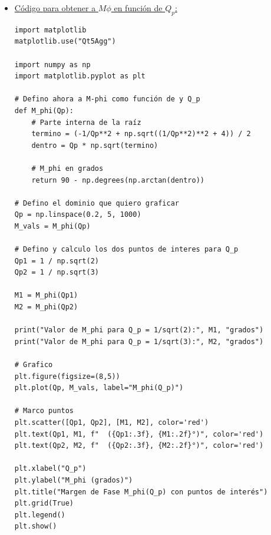 \documentclass[12pt,a4paper]{article}
\begin{document}
\begin{itemize}
\begin{verbatim}
Omega1 = Omega_G(Qp1)
Omega2 = Omega_G(Qp2)
        
print("Valor de Omega_G para Q_p = 1/sqrt(2):", Omega1)
print("Valor de Omega_G para Q_p = 1/sqrt(3):", Omega2)
        
# Grafico
plt.figure(figsize=(8,5))
plt.plot(Qp, Omega_vals, label="Omega_G(Q_p)")
        
# Marco puntos
plt.scatter([Qp1, Qp2], [Omega1, Omega2], color='red')
plt.text(Qp1, Omega1, f"  ({Qp1:.3f}, {Omega1:.3f})", color='red')
plt.text(Qp2, Omega2, f"  ({Qp2:.3f}, {Omega2:.3f})", color='red')
        
plt.xlabel("Q_p")
plt.ylabel("Omega_G")
plt.title("Omega_G(Q_p) con puntos de interés")
plt.grid(True)
plt.legend()
plt.show()
\end{verbatim}
    

    \item \underline{Código para obtener a $M\phi$ en función de $Q_p$:}
\begin{verbatim}
import matplotlib
matplotlib.use("Qt5Agg")

import numpy as np
import matplotlib.pyplot as plt

# Defino ahora a M-phi como función de y Q_p
def M_phi(Qp):
    # Parte interna de la raíz
    termino = (-1/Qp**2 + np.sqrt((1/Qp**2)**2 + 4)) / 2
    dentro = Qp * np.sqrt(termino)

    # M_phi en grados
    return 90 - np.degrees(np.arctan(dentro))

# Defino el dominio que quiero graficar
Qp = np.linspace(0.2, 5, 1000)
M_vals = M_phi(Qp)

# Defino y calculo los dos puntos de interes para Q_p
Qp1 = 1 / np.sqrt(2)
Qp2 = 1 / np.sqrt(3)

M1 = M_phi(Qp1)
M2 = M_phi(Qp2)

print("Valor de M_phi para Q_p = 1/sqrt(2):", M1, "grados")
print("Valor de M_phi para Q_p = 1/sqrt(3):", M2, "grados")

# Grafico
plt.figure(figsize=(8,5))
plt.plot(Qp, M_vals, label="M_phi(Q_p)")

# Marco puntos
plt.scatter([Qp1, Qp2], [M1, M2], color='red')
plt.text(Qp1, M1, f"  ({Qp1:.3f}, {M1:.2f}°)", color='red')
plt.text(Qp2, M2, f"  ({Qp2:.3f}, {M2:.2f}°)", color='red')

plt.xlabel("Q_p")
plt.ylabel("M_phi (grados)")
plt.title("Margen de Fase M_phi(Q_p) con puntos de interés")
plt.grid(True)
plt.legend()
plt.show()
\end{verbatim}
\end{itemize}
    
\end{document}
